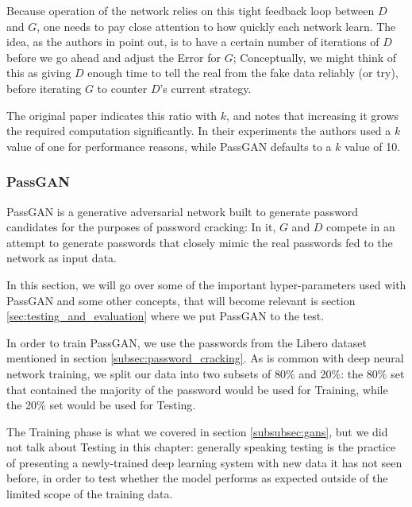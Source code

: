 Because operation of the network relies on this tight feedback loop between $D$ and $G$, one needs to pay close attention to how quickly each network learn.
The idea, as the authors in \cite{Goodfellow2014} point out, is to have a certain number of iterations of $D$ before we go ahead and adjust the Error for $G$; Conceptually, we might think of this as giving $D$ enough time to tell the real from the fake data reliably (or try), before iterating $G$ to counter $D$'s current strategy.

The original paper indicates this ratio with $k$, and notes that increasing it grows the required computation significantly. In their experiments the authors used a $k$ value of one for performance reasons, while PassGAN defaults to a $k$ value of 10\cite{PassGAN}.

\subsubsection{PassGAN}
PassGAN is a generative adversarial network built to generate password candidates for the purposes of password cracking: In it, $G$ and $D$ compete in an attempt to generate passwords that closely mimic the real passwords fed to the network as input data.

In this section, we will go over some of the important hyper-parameters used with PassGAN and some other concepts, that will become relevant is section \ref{sec:testing_and_evaluation} where we put PassGAN to the test.

In order to train PassGAN, we use the passwords from the Libero dataset mentioned in section \ref{subsec:password_cracking}. As is common with deep neural network training, we split our data into two subsets of 80\% and 20\%: the 80\% set that contained the majority of the password would be used for Training, while the 20\% set would be used for Testing. 

 The Training phase is what we covered in section \ref{subsubsec:gans}, but we did not talk about Testing in this chapter: generally speaking testing is the practice of presenting a newly-trained deep learning system with new data it has not seen before, in order to test whether the model performs as expected outside of the limited scope of the training data.

